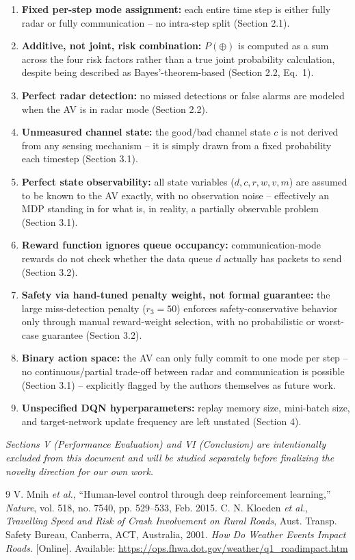 \documentclass[11pt]{article}
\begin{document}
\begin{enumerate}[leftmargin=1.5em]
    \item \textbf{Fixed per-step mode assignment:} each entire time step is either fully
    radar or fully communication -- no intra-step split (Section 2.1).
    \item \textbf{Additive, not joint, risk combination:} $P(\oplus)$ is computed as a
    sum across the four risk factors rather than a true joint probability calculation,
    despite being described as Bayes'-theorem-based (Section 2.2, Eq.~1).
    \item \textbf{Perfect radar detection:} no missed detections or false alarms are
    modeled when the AV is in radar mode (Section 2.2).
    \item \textbf{Unmeasured channel state:} the good/bad channel state $c$ is not
    derived from any sensing mechanism -- it is simply drawn from a fixed probability
    each timestep (Section 3.1).
    \item \textbf{Perfect state observability:} all state variables
    ($d,c,r,w,v,m$) are assumed to be known to the AV exactly, with no observation
    noise -- effectively an MDP standing in for what is, in reality, a partially
    observable problem (Section 3.1).
    \item \textbf{Reward function ignores queue occupancy:} communication-mode rewards
    do not check whether the data queue $d$ actually has packets to send (Section 3.2).
    \item \textbf{Safety via hand-tuned penalty weight, not formal guarantee:} the large
    miss-detection penalty ($r_3=50$) enforces safety-conservative behavior only through
    manual reward-weight selection, with no probabilistic or worst-case guarantee
    (Section 3.2).
    \item \textbf{Binary action space:} the AV can only fully commit to one mode per
    step -- no continuous/partial trade-off between radar and communication is possible
    (Section 3.1) -- explicitly flagged by the authors themselves as future work.
    \item \textbf{Unspecified DQN hyperparameters:} replay memory size, mini-batch size,
    and target-network update frequency are left unstated (Section 4).
\end{enumerate}

\bigskip
\noindent\textit{Sections V (Performance Evaluation) and VI (Conclusion) are
intentionally excluded from this document and will be studied separately before
finalizing the novelty direction for our own work.}

\begin{thebibliography}{9}
 V. Mnih \emph{et al.}, ``Human-level control through deep
reinforcement learning,'' \emph{Nature}, vol. 518, no. 7540, pp. 529--533, Feb. 2015.
 C. N. Kloeden \emph{et al.}, \emph{Travelling Speed and Risk of Crash
Involvement on Rural Roads}, Aust. Transp. Safety Bureau, Canberra, ACT, Australia,
2001.
 \emph{How Do Weather Events Impact Roads}. [Online]. Available:
\url{https://ops.fhwa.dot.gov/weather/q1_roadimpact.htm}
\end{thebibliography}
\end{document}
